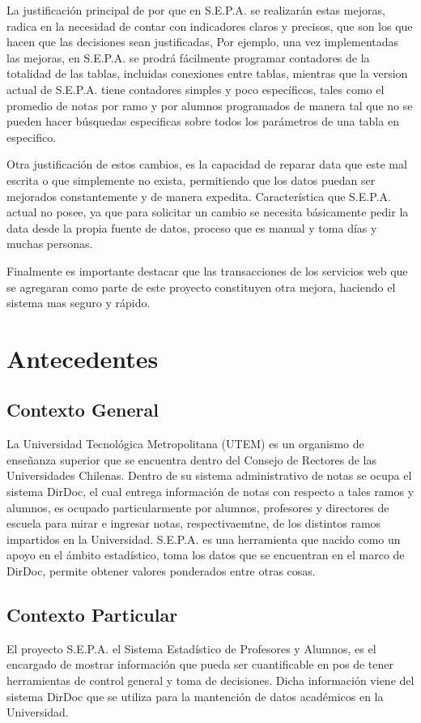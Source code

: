 \documentclass[a4paper,12pt,openany,oneside]{book}
\begin{document}
La justificación principal de por que en S.E.P.A. se realizarán estas mejoras, radica en la necesidad de contar con indicadores claros y precisos, que son los que hacen que las decisiones sean justificadas, Por ejemplo, una vez implementadas las mejoras, en S.E.P.A. se prodrá fácilmente programar contadores de la totalidad de las tablas, incluidas conexiones entre tablas, mientras que la version actual de S.E.P.A. tiene contadores simples y poco específicos, tales como el promedio de notas por ramo y por alumnos programados de manera tal que no se pueden hacer búsquedas especificas sobre todos los parámetros de una tabla en especifico.

Otra justificación de estos cambios, es la capacidad de reparar data que este mal escrita o que simplemente no exista, permitiendo que los datos puedan ser mejorados constantemente y de manera expedita. Característica que S.E.P.A. actual no posee, ya que para solicitar un cambio se necesita básicamente pedir la data desde la propia fuente de datos, proceso que es manual y toma días y muchas personas.

Finalmente es importante destacar que las transacciones de los servicios web que se agregaran como parte de este proyecto constituyen otra mejora, haciendo el sistema mas seguro y rápido.

\chapter{Antecedentes}
\thispagestyle{empty}
\section{Contexto General}
La Universidad Tecnológica Metropolitana (UTEM) es un organismo de enseñanza superior que se encuentra dentro del Consejo de Rectores de las Universidades Chilenas. Dentro de su sistema administrativo de notas se ocupa el sistema DirDoc, el cual entrega información de notas con respecto a tales ramos y alumnos, es ocupado particularmente por alumnos, profesores y directores de escuela para  mirar e ingresar notas, respectivaemtne, de los distintos ramos impartidos en la Universidad. S.E.P.A. es una herramienta que nacido como un apoyo en el ámbito estadístico, toma los datos que se encuentran en el marco de DirDoc, permite obtener valores ponderados entre otras cosas.
\section{Contexto Particular}
El proyecto S.E.P.A. el Sistema Estadístico de Profesores y Alumnos, es el encargado de mostrar información que pueda ser cuantificable en pos de tener herramientas de control general y toma de decisiones. Dicha información viene del sistema DirDoc que se utiliza para la mantención de datos académicos en la Universidad.
\end{document}
